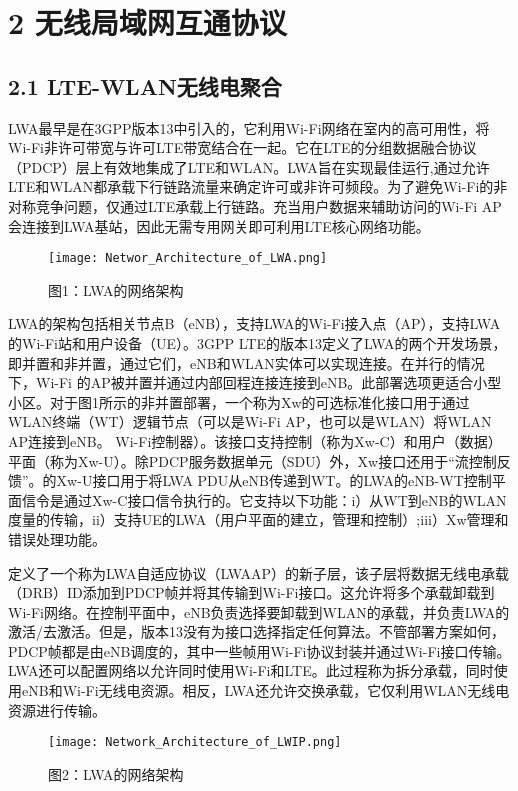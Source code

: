 \newpage
\section*{2 无线局域网互通协议}
\subsection*{2.1 LTE-WLAN无线电聚合}
LWA最早是在3GPP版本13中引入的，它利用Wi-Fi网络在室内的高可用性，将Wi-Fi非许可带宽与许可LTE带宽结合在一起。它在LTE的分组数据融合协议（PDCP）层上有效地集成了LTE和WLAN。LWA旨在实现最佳运行,通过允许LTE和WLAN都承载下行链路流量来确定许可或非许可频段。为了避免Wi-Fi的非对称竞争问题，仅通过LTE承载上行链路。充当用户数据来辅助访问的Wi-Fi AP会连接到LWA基站，因此无需专用网关即可利用LTE核心网络功能。

\begin{figure}[htb]
  \centering
  \texttt{[image: Networ\_Architecture\_of\_LWA.png]}
  \caption*{图1：LWA的网络架构}
\end{figure}

LWA的架构包括相关节点B（eNB），支持LWA的Wi-Fi接入点（AP），支持LWA的Wi-Fi站和用户设备（UE）。3GPP LTE的版本13定义了LWA的两个开发场景，即并置和非并置，通过它们，eNB和WLAN实体可以实现连接。在并行的情况下，Wi-Fi 的AP被并置并通过内部回程连接连接到eNB。此部署选项更适合小型小区。对于图1所示的非并置部署，一个称为Xw的可选标准化接口用于通过WLAN终端（WT）逻辑节点（可以是Wi-Fi AP，也可以是WLAN）将WLAN AP连接到eNB。 Wi-Fi控制器）。该接口支持控制（称为Xw-C）和用户（数据）平面（称为Xw-U）。除PDCP服务数据单元（SDU）外，Xw接口还用于“流控制反馈”。的Xw-U接口用于将LWA PDU从eNB传递到WT。的LWA的eNB-WT控制平面信令是通过Xw-C接口信令执行的。它支持以下功能：i）从WT到eNB的WLAN度量的传输，ii）支持UE的LWA（用户平面的建立，管理和控制）;iii）Xw管理和错误处理功能。

定义了一个称为LWA自适应协议（LWAAP）的新子层，该子层将数据无线电承载（DRB）ID添加到PDCP帧并将其传输到Wi-Fi接口。这允许将多个承载卸载到Wi-Fi网络。在控制平面中，eNB负责选择要卸载到WLAN的承载，并负责LWA的激活/去激活。但是，版本13没有为接口选择指定任何算法。不管部署方案如何，PDCP帧都是由eNB调度的，其中一些帧用Wi-Fi协议封装并通过Wi-Fi接口传输。LWA还可以配置网络以允许同时使用Wi-Fi和LTE。此过程称为拆分承载，同时使用eNB和Wi-Fi无线电资源。相反，LWA还允许交换承载，它仅利用WLAN无线电资源进行传输。

\begin{figure}[htb]
  \centering
  \texttt{[image: Network\_Architecture\_of\_LWIP.png]}
  \caption*{图2：LWA的网络架构}
\end{figure}

